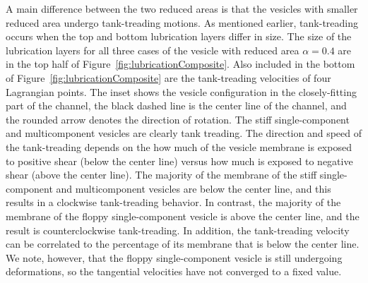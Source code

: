 \documentclass[twoside,twocolumn,9pt]{article}
\begin{document}
A main difference between the two reduced areas is that the vesicles
with smaller reduced area undergo tank-treading motions. As mentioned
earlier, tank-treading occurs when the top and bottom lubrication layers
differ in size. The size of the lubrication layers for all three cases
of the vesicle with reduced area $\alpha = 0.4$ are in the top half of
Figure~\ref{fig:lubricationComposite}. Also included in the bottom of
Figure~\ref{fig:lubricationComposite} are the tank-treading velocities
of four Lagrangian points. The inset shows the vesicle configuration in
the closely-fitting part of the channel, the black dashed line is the
center line of the channel, and the rounded arrow denotes the direction
of rotation. The stiff single-component and multicomponent vesicles are
clearly tank treading. The direction and speed of the tank-treading
depends on the how much of the vesicle membrane is exposed to positive
shear (below the center line) versus how much is exposed to negative
shear (above the center line). The majority of the membrane of the stiff
single-component and multicomponent vesicles are below the center line,
and this results in a clockwise tank-treading behavior. In contrast, the
majority of the membrane of the floppy single-component vesicle is above
the center line, and the result is counterclockwise tank-treading. In
addition, the tank-treading velocity can be correlated to the percentage
of its membrane that is below the center line. We note, however, that
the floppy single-component vesicle is still undergoing deformations, so
the tangential velocities have not converged to a fixed value.



\end{document}
